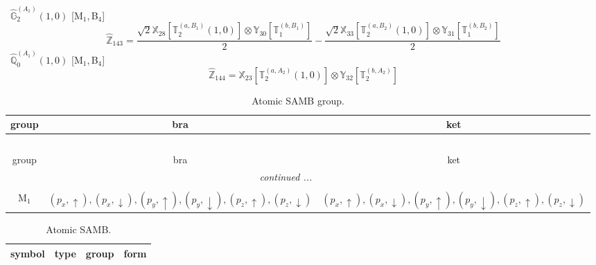 \documentclass[fleqn,10pt,landscape]{article}
\begin{document}
\begin{itemize}
\begin{dmath*}
\end{dmath*}
\vspace{4mm}
\noindent {} $\,\,\,\hat{\mathbb{G}}_{2}^{(A_{1})}(1,0)$ [M$_{1}$,\,B$_{4}$]
\begin{dmath*}
\hat{\mathbb{Z}}_{143}=\frac{\sqrt{2} \mathbb{X}_{28}[\mathbb{T}_{2}^{(a,B_{1})}(1,0)] \otimes\mathbb{Y}_{30}[\mathbb{T}_{1}^{(b,B_{1})}]}{2} - \frac{\sqrt{2} \mathbb{X}_{33}[\mathbb{T}_{2}^{(a,B_{2})}(1,0)] \otimes\mathbb{Y}_{31}[\mathbb{T}_{1}^{(b,B_{2})}]}{2}
\end{dmath*}
\vspace{4mm}
\noindent {} $\,\,\,\hat{\mathbb{Q}}_{0}^{(A_{1})}(1,0)$ [M$_{1}$,\,B$_{4}$]
\begin{dmath*}
\hat{\mathbb{Z}}_{144}=\mathbb{X}_{23}[\mathbb{T}_{2}^{(a,A_{2})}(1,0)] \otimes\mathbb{Y}_{32}[\mathbb{T}_{2}^{(b,A_{2})}]
\end{dmath*}
\begin{center}
\renewcommand{\arraystretch}{1.3}
\begin{longtable}{c|c|c}
\caption{Atomic SAMB group.}
 \\
 \hline \hline
group & bra & ket \\ \hline \endfirsthead

\multicolumn{2}{l}{\tablename\ \thetable{}} \\
 \hline \hline
group & bra & ket \\ \hline \endhead

 \hline \hline
\multicolumn{2}{r}{\footnotesize\it continued ...} \\ \endfoot

 \hline \hline
\multicolumn{2}{r}{} \\ \endlastfoot

M$_{1}$ & $(p_{x},\uparrow), (p_{x},\downarrow), (p_{y},\uparrow), (p_{y},\downarrow), (p_{z},\uparrow), (p_{z},\downarrow)$ & $(p_{x},\uparrow), (p_{x},\downarrow), (p_{y},\uparrow), (p_{y},\downarrow), (p_{z},\uparrow), (p_{z},\downarrow)$ \\
\end{longtable}
\end{center}
\begin{center}
\renewcommand{\arraystretch}{1.3}
\begin{longtable}{c|c|c|c}
\caption{Atomic SAMB.}
 \\
 \hline \hline
symbol & type & group & form \\ \hline \endfirsthead


\end{longtable}
\end{center}
\end{itemize}
\end{document}
